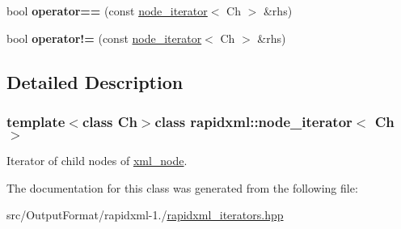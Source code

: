 \begin{DoxyCompactItemize}
\item 
\hypertarget{classrapidxml_1_1node__iterator_a5cb8a3b0d65a1a2517995e986a4debfd}{bool {\bfseries operator==} (const \hyperlink{classrapidxml_1_1node__iterator}{node\-\_\-iterator}$<$ Ch $>$ \&rhs)}\label{classrapidxml_1_1node__iterator_a5cb8a3b0d65a1a2517995e986a4debfd}

\item 
\hypertarget{classrapidxml_1_1node__iterator_a20f1e25347d7e3856694f18597f7c8e2}{bool {\bfseries operator!=} (const \hyperlink{classrapidxml_1_1node__iterator}{node\-\_\-iterator}$<$ Ch $>$ \&rhs)}\label{classrapidxml_1_1node__iterator_a20f1e25347d7e3856694f18597f7c8e2}

\end{DoxyCompactItemize}


\subsection{Detailed Description}
\subsubsection*{template$<$class Ch$>$class rapidxml\-::node\-\_\-iterator$<$ Ch $>$}

Iterator of child nodes of \hyperlink{classrapidxml_1_1xml__node}{xml\-\_\-node}. 

The documentation for this class was generated from the following file\-:\begin{DoxyCompactItemize}
\item 
src/\-Output\-Format/rapidxml-\/1./\hyperlink{rapidxml__iterators_8hpp}{rapidxml\-\_\-iterators.\-hpp}\end{DoxyCompactItemize}
